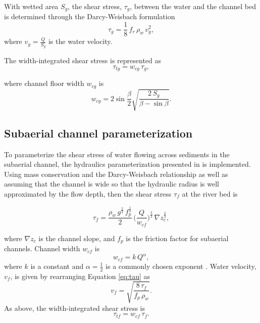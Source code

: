 \documentclass[draft]{agujournal2019}
\begin{document}
With wetted area $S_g$, the shear stress, $\tau_g$, between the water and the channel bed is determined through the Darcy-Weisbach formulation
\begin{equation}
  \label{eq:tau}
  \tau_g=\frac{1}{8}\,f_r\,\rho_w\,v_g^2,
\end{equation}
%
where $v_g = \frac{Q}{S_g}$ is the water velocity.

The width-integrated shear stress is represented as
\begin{equation}
  \label{eq:tautg}
  \tau_{tg}=w_{cg}\,\tau_g,
\end{equation}

where  channel floor width $w_{cg}$ is
\begin{equation}
  \label{eq:dh2wc}
  w_{cg} = 2  \sin \frac{\beta}{2} \sqrt{\frac{2\, S_g}{\beta -\sin \beta}}.
\end{equation}

\subsection{Subaerial channel  parameterization}
\label{sect:fluv}

To parameterize the shear stress of water flowing across sediments in the subaerial channel, the hydraulics parameterization presented in  is implemented.
Using mass conservation and the Darcy-Weisbach relationship as well as assuming that the channel is wide so that the hydraulic radius is well approximated by the flow depth, then
the shear stress $\tau_f$ at the river bed is
\begin{linenomath*}
  \begin{equation}
    \label{eq:DW_tau}
    \tau_f=\frac{\rho_w\,g^{\frac{2}{3}}\,f_p^{\frac{1}{3}}}{2}\, \Big(\frac{Q}{w_{cf}} \Big)^{\frac{2}{3}} \,\nabla z_c^{\frac{2}{3}},
  \end{equation}
\end{linenomath*}
where $\nabla z_c$ is the channel slope, and $f_p$ is the friction factor for subaerial channels.
Channel width $w_{cf}$ is
\begin{equation}
  \label{eq:wcf}
  w_{cf} = k \, Q^{\alpha},
\end{equation}
%
where $k$ is a constant and $\alpha=\frac{1}{2}$ is a commonly chosen exponent \cite{leopold1953}.
Water velocity, $v_f$, is given by rearranging Equation \ref{eq:tau} as
\begin{equation}
  \label{eq:vf}
  v_f = \sqrt{\frac{8\,\tau_f}{f_p\,\rho_w}}.
\end{equation}
%
As above, the width-integrated shear stress is
\begin{equation}
    \label{eq:tautf}
    \tau_{tf}=w_{cf}\,\tau_f.
  \end{equation}
\end{document}

